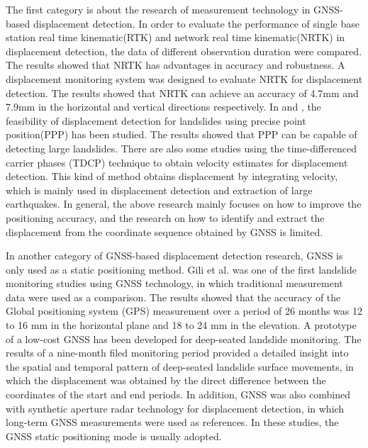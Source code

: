 \documentclass[final,3p,times]{elsarticle}
\begin{document}
	The first category is about the research of measurement technology in GNSS-based displacement detection.
	In order to evaluate the performance of single base station real time kinematic(RTK) and network real time kinematic(NRTK) in displacement detection, the data of different observation duration were compared\cite{wang2011gps}. The results showed that NRTK has advantages in accuracy and robustness.
	A displacement monitoring system was designed to evaluate NRTK for displacement detection\cite{GUMUS2019131}. The results showed that NRTK can achieve an accuracy of 4.7mm and 7.9mm in the horizontal and vertical directions respectively.
	In \cite{csanliouglu2016landslide} and \cite{lytvyn2012real}, the feasibility of displacement detection for landslides  using precise point position(PPP) has been studied. The results showed that PPP can be capable of detecting large landslides.
	There are also some studies using the time-differenced carrier phases (TDCP) technique\cite{freda2015time,colosimo2011real} to obtain velocity estimates for displacement detection. This kind of method obtains displacement by integrating velocity, which is mainly used in displacement detection and extraction of large earthquakes.
	In general, the above research mainly focuses on how to improve the positioning accuracy, and the research on how to identify and extract the displacement from the coordinate sequence obtained by GNSS is limited.
	
	In another category of GNSS-based displacement detection research, GNSS is only used as a static positioning method.
	Gili et al.\cite{gili2000using} was one of the first landslide monitoring studies using GNSS technology, in which traditional measurement data were used as a comparison. 
	The results showed that the accuracy of the Global positioning system (GPS) measurement over a period of 26 months was 12 to 16 mm in the horizontal plane and 18 to 24 mm in the elevation.
	A prototype of a low-cost GNSS has been developed for deep-seated landslide monitoring\cite{rs12203375}. 
	The results of a nine-month filed monitoring period provided a detailed insight into the spatial and temporal pattern of deep-seated landslide surface movements, in which the displacement was obtained by the direct difference between the coordinates of the start and end periods.
	In addition, GNSS was also combined with synthetic aperture radar technology for displacement detection, in which long-term GNSS measurements were used as references\cite{atanasova2018ground,fuhrmann2015estimation}.
	In these studies, the GNSS static positioning mode is usually adopted.
	
\end{document}
